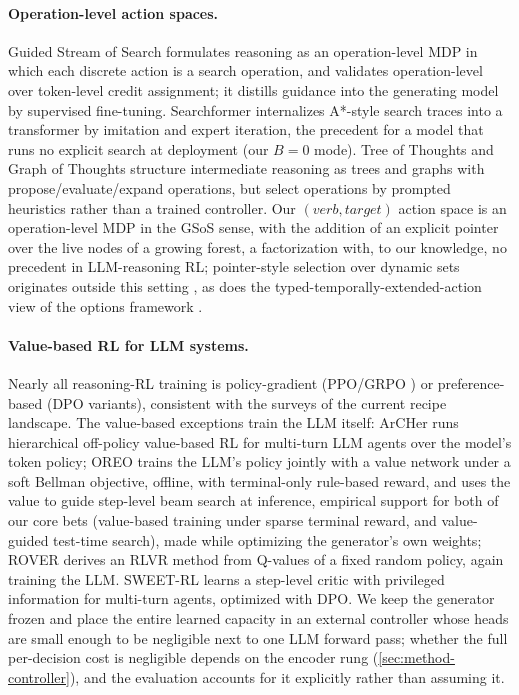 \paragraph{Operation-level action spaces.}
Guided Stream of Search \citep{gsos} formulates reasoning as an
operation-level MDP in which each discrete action is a search operation,
and validates operation-level over token-level credit assignment; it
distills guidance into the generating model by supervised fine-tuning.
Searchformer \citep{searchformer} internalizes A*-style search traces into
a transformer by imitation and expert iteration, the precedent for a model
that runs no explicit search at deployment (our $B{=}0$ mode). Tree of
Thoughts \citep{tot} and Graph of Thoughts \citep{got} structure
intermediate reasoning as trees and graphs with propose/evaluate/expand
operations, but select operations by prompted heuristics rather than a
trained controller. Our $(\textit{verb}, \textit{target})$ action space is
an operation-level MDP in the GSoS sense, with the addition of an explicit
pointer over the live nodes of a growing forest, a factorization with, to
our knowledge, no precedent in LLM-reasoning RL; pointer-style selection
over dynamic sets originates outside this setting \citep{pointernets}, as
does the typed-temporally-extended-action view of the options framework
\citep{options}.

\paragraph{Value-based RL for LLM systems.}
Nearly all reasoning-RL training is policy-gradient (PPO/GRPO
\citep{deepseekr1, tulu3}) or preference-based (DPO variants), consistent
with the surveys of the current recipe landscape. The value-based exceptions
train the LLM itself: ArCHer \citep{archer} runs hierarchical off-policy
value-based RL for multi-turn LLM agents over the model's token policy;
OREO \citep{oreo} trains the LLM's policy jointly with a value network under
a soft Bellman objective, offline, with terminal-only rule-based reward, and
uses the value to guide step-level beam search at inference, empirical
support for both of our core bets (value-based training under sparse
terminal reward, and value-guided test-time search), made while optimizing
the generator's own weights; ROVER \citep{rover} derives an RLVR method from
Q-values of a fixed random policy, again training the LLM. SWEET-RL
\citep{sweetrl} learns a step-level critic with privileged information for
multi-turn agents, optimized with DPO. We keep the generator frozen and
place the entire learned capacity in an external controller whose heads
are small enough to be negligible next to one LLM forward pass; whether
the full per-decision cost is negligible depends on the encoder rung
(\cref{sec:method-controller}), and the evaluation accounts for it
explicitly rather than assuming it.

